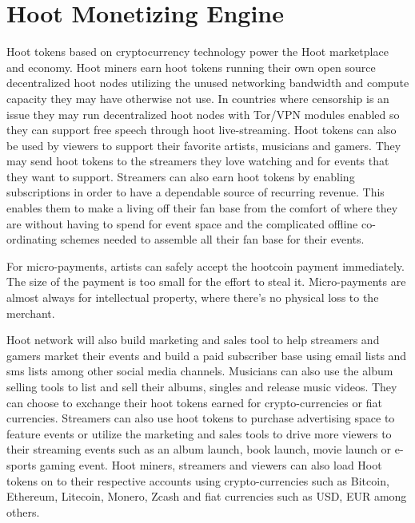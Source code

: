 \documentclass{article}
\begin{document}
\section{Hoot Monetizing Engine}
Hoot tokens based on cryptocurrency technology power the Hoot
marketplace and economy. Hoot miners earn hoot tokens running their own open source
decentralized hoot nodes utilizing the unused networking bandwidth
and compute capacity they may have otherwise not use. In countries where censorship is an issue they
may run decentralized hoot nodes with Tor/VPN modules enabled so they can
support free speech through hoot
live-streaming. Hoot tokens can also be used by viewers to support their favorite artists,
musicians and gamers. They may send hoot tokens to the
streamers they love watching and for events that they want to
support. Streamers can also earn hoot tokens by enabling subscriptions in order to have a
dependable source of recurring revenue. This enables them to make a
living off their fan base from the comfort of where they are without
having to spend for event space and the complicated offline
co-ordinating schemes needed to assemble all their fan base for their events.

For micro-payments, artists can safely accept the hootcoin payment immediately.  The size of the payment is too small for the effort to steal it. Micro-payments are almost always for intellectual property, where there's no physical loss to the merchant. 

 Hoot network will also build marketing and sales tool to help streamers and gamers market their 
events and build a paid subscriber base using email lists and sms lists among other social media channels. 
Musicians can also use the album selling tools to list and sell
their albums, singles and release music videos. They can choose to exchange their hoot tokens earned for crypto-currencies or fiat currencies.
 Streamers can also use hoot tokens to
purchase advertising space to feature events or utilize the marketing and sales
tools to drive more viewers to their
streaming events such as an album launch, book launch, movie launch or
e-sports gaming event. Hoot miners, streamers and viewers can also load Hoot
tokens on to their respective accounts using crypto-currencies such as Bitcoin,
Ethereum, Litecoin, Monero, Zcash and fiat currencies such as USD, EUR among others.
\end{document}
